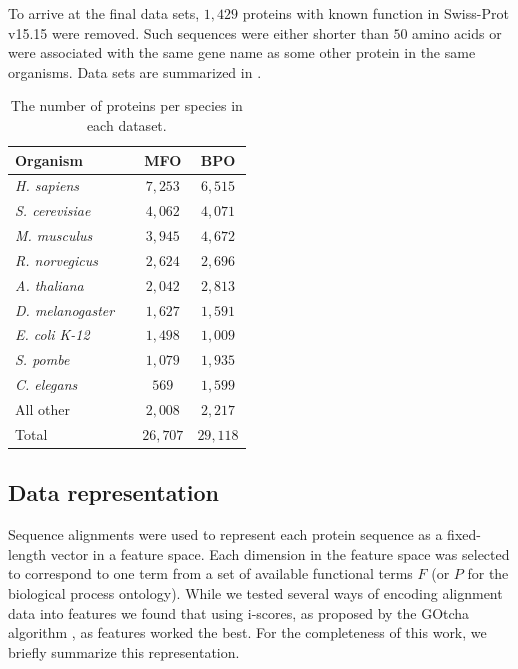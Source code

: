 To arrive at the final data sets, $1,429$ proteins with known function in Swiss-Prot v15.15 were removed. Such sequences were either shorter than $50$ amino acids or were associated with the same gene name as some other protein in the same organisms. Data sets are summarized in .


\begin{table}[t]
\caption{The number of proteins per species in each dataset.
\label{tab:fanngoT1}}
{
\begin{tabular}{lccc}
\hline
Organism & \hspace*{3cm} & MFO & BPO\\
\hline
\emph{H. sapiens} & \hphantom & $7,253$ & $6,515$\\
\emph{S. cerevisiae} & \hphantom & $4,062$ & $4,071$\\
\emph{M. musculus} & \hphantom & $3,945$ & $4,672$\\
\emph{R. norvegicus} & \hphantom & $2,624$ & $2,696$\\
\emph{A. thaliana} & \hphantom & $2,042$ & $2,813$\\
\emph{D. melanogaster} & \hphantom & $1,627$ & $1,591$\\
\emph{E. coli K-12} & \hphantom & $1,498$ & $1,009$\\
\emph{S. pombe} & \hphantom & $1,079$ & $1,935$\\
\emph{C. elegans}  & \hphantom& $569$ & $1,599$\\
All other & \hphantom & $2,008$ & $2,217$\\
\hline
Total & \hphantom & $26,707$ & $29,118$\\
\end{tabular}}{}

\end{table}


\subsection{Data representation}

Sequence alignments were used to represent each protein sequence as a fixed-length vector in a feature space. Each dimension in the feature space was selected to correspond to one term from a set of available functional terms $F$ (or $P$ for the biological process ontology). While we tested several ways of encoding alignment data into features we found that using i-scores, as proposed by the GOtcha algorithm \citep{Martin2004}, as features worked the best. For the completeness of this work, we briefly summarize this representation. 


